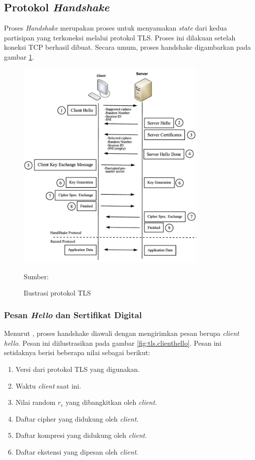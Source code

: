 \subsection{Protokol \emph{Handshake}}
\label{sec:tls.handshake}

Proses \emph{Handshake} merupakan proses untuk menyamakan \emph{state} dari kedua partisipan yang terkoneksi melalui protokol TLS. Proses ini dilakuan setelah koneksi TCP berhasil dibuat. Secara umum, proses handshake
digambarkan pada gambar \ref{fig:tls.handshake}.

\begin{figure}[!h]
  \centering
  \includegraphics[width=350px]{chapters/res/chapter-2/img/tls.protocol.png}
  \caption{Ilustrasi protokol TLS} \label{fig:tls.handshake}
  Sumber: \textcite{shbair2016}
\end{figure}

\subsubsection{Pesan \emph{Hello} dan Sertifikat Digital}
Menurut \textcite{rfc5246}, proses handshake diawali dengan mengirimkan pesan berupa \emph{client hello}. Pesan ini diilustrasikan pada gambar \ref{fig:tls.clienthello}. Pesan ini setidaknya berisi beberapa nilai sebagai berikut:
\begin{enumerate}
  \item Versi dari protokol TLS yang digunakan.
  \item Waktu \emph{client} saat ini.
  \item Nilai random $r_c$ yang dibangkitkan oleh \emph{client}.
  \item Daftar cipher yang didukung oleh \emph{client}.
  \item Daftar kompresi yang didukung oleh \emph{client}.
  \item Daftar ekstensi yang dipesan oleh \emph{client}.
\end{enumerate}

